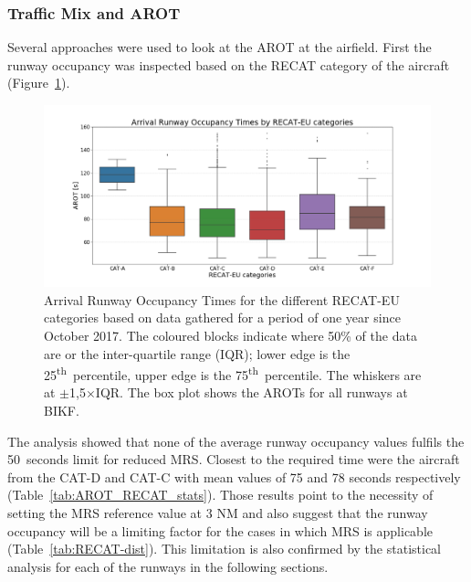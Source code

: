 \subsubsection{Traffic Mix and AROT\label{sssec:mix_effect_arot}}
Several approaches were used to look at the AROT at the airfield. First the runway occupancy was inspected based on the RECAT category of the aircraft (Figure~\ref{fig:RECAT_AROTs_boxplot}). 
\begin{figure}[h]
    \centering
    \includegraphics[width=1\textwidth]{graphics/fig_RECAT_AROTs_boxplot.png}
    \caption[AROTs box-plot for RECAT categories, all runways]{Arrival Runway Occupancy Times for the different RECAT-EU categories based on data gathered for a period of one year since October 2017. The coloured blocks indicate where 50\% of the data are or the inter-quartile range (IQR); lower edge is the 25\textsuperscript{th}~percentile, upper edge is the 75\textsuperscript{th}~percentile. The whiskers are at $\pm$1,5$\times$IQR.  The box plot shows the AROTs for all runways at BIKF.}
    \label{fig:RECAT_AROTs_boxplot}
\end{figure}
The analysis showed that none of the average runway occupancy values fulfils the 50~seconds limit for reduced MRS. Closest to the required time were the aircraft from the CAT-D and CAT-C with mean values of 75 and 78 seconds respectively (Table~\ref{tab:AROT_RECAT_stats}). Those results point to the necessity of setting the MRS reference value at 3 NM and also suggest that the runway occupancy will be a limiting factor for the cases in which MRS is applicable (Table~\ref{tab:RECAT-dist}). This limitation is also confirmed by the statistical analysis for each of the runways in the following sections.%

